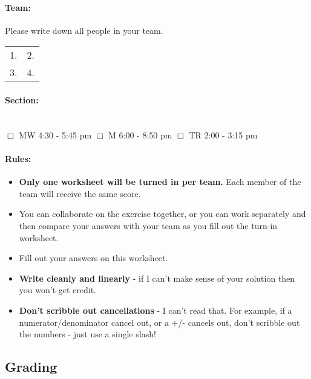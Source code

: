 \documentclass[a4paper,12pt]{book}
\begin{document}
    \paragraph{Team:}
    Please write down all people in your team. ~\\

    \begin{tabular}{ p{6cm} p{6cm} }
        1. & 2. \\
        3. & 4.
    \end{tabular}

    \paragraph{Section:} ~\\
        $\Box$ MW 4:30 - 5:45 pm \tab
        $\Box$ M 6:00 - 8:50 pm \tab
        $\Box$ TR 2:00 - 3:15 pm

    \paragraph{Rules:}

    \begin{itemize}
        \item \textbf{Only one worksheet will be turned in per team.}
            Each member of the team will receive the same score.
        \item You can collaborate on the exercise together, or you can
            work separately and then compare your answers with your team
            as you fill out the turn-in worksheet.
        \item Fill out your answers on this worksheet.
        \item \textbf{Write cleanly and linearly} - if I can't make sense of
            your solution then you won't get credit.
        \item \textbf{Don't scribble out cancellations} - I can't read that.
            For example, if a numerator/denominator cancel out, or a +/-
            cancels out, don't scribble out the numbers - just use a single slash!
    \end{itemize}


    
    \newpage
    \subsection*{Grading}
    
\end{document}

